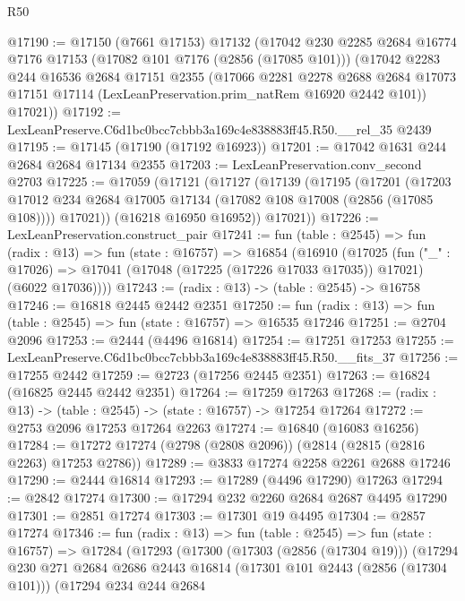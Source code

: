 \begin{lexlean}{R50}
\begin{coremodule}
@17190 := @17150
    (@7661 @17153)
    @17132
    (@17042
      @230
      @2285
      @2684
      @16774
      @7176
      @17153
      (@17082 @101 @7176 (@2856 (@17085 @101)))
      (@17042
        @2283
        @244
        @16536
        @2684
        @17151
        @2355
        (@17066
          @2281
          @2278
          @2688
          @2684
          @17073
          @17151
          @17114
          (LexLeanPreservation.prim_natRem @16920 @2442 @101))
        @17021))
@17192 := LexLeanPreserve.C6d1bc0bcc7cbbb3a169c4e838883ff45.R50.__rel_35 @2439
@17195 := @17145 (@17190 (@17192 @16923))
@17201 := @17042 @1631 @244 @2684 @2684 @17134 @2355
@17203 := LexLeanPreservation.conv_second @2703
@17225 := @17059
    (@17121
      (@17127
        (@17139
          (@17195
            (@17201
              (@17203 @17012 @234 @2684 @17005 @17134 (@17082 @108 @17008 (@2856 (@17085 @108))))
              @17021))
          (@16218 @16950 @16952))
        @17021))
@17226 := LexLeanPreservation.construct_pair
@17241 := fun (table : @2545) =>
  fun (radix : @13) =>
  fun (state : @16757) =>
  @16854
    (@16910
      (@17025
        (fun ("_" : @17026) =>
        @17041 (@17048 (@17225 (@17226 @17033 @17035)) @17021) (@6022 @17036))))
@17243 := (radix : @13) -> (table : @2545) -> @16758
@17246 := @16818 @2445 @2442 @2351
@17250 := fun (radix : @13) => fun (table : @2545) => fun (state : @16757) => @16535 @17246
@17251 := @2704 @2096
@17253 := @2444 (@4496 @16814)
@17254 := @17251 @17253
@17255 := LexLeanPreserve.C6d1bc0bcc7cbbb3a169c4e838883ff45.R50.__fits_37
@17256 := @17255 @2442
@17259 := @2723 (@17256 @2445 @2351)
@17263 := @16824 (@16825 @2445 @2442 @2351)
@17264 := @17259 @17263
@17268 := (radix : @13) -> (table : @2545) -> (state : @16757) -> @17254 @17264
@17272 := @2753 @2096 @17253 @17264 @2263
@17274 := @16840 (@16083 @16256)
@17284 := @17272 @17274 (@2798 (@2808 @2096)) (@2814 (@2815 (@2816 @2263) @17253 @2786))
@17289 := @3833 @17274 @2258 @2261 @2688 @17246
@17290 := @2444 @16814
@17293 := @17289 (@4496 @17290) @17263
@17294 := @2842 @17274
@17300 := @17294 @232 @2260 @2684 @2687 @4495 @17290
@17301 := @2851 @17274
@17303 := @17301 @19 @4495
@17304 := @2857 @17274
@17346 := fun (radix : @13) =>
  fun (table : @2545) =>
  fun (state : @16757) =>
  @17284
    (@17293
      (@17300
        (@17303 (@2856 (@17304 @19)))
        (@17294
          @230
          @271
          @2684
          @2686
          @2443
          @16814
          (@17301 @101 @2443 (@2856 (@17304 @101)))
          (@17294
            @234
            @244
            @2684

\end{coremodule}
\end{lexlean}
